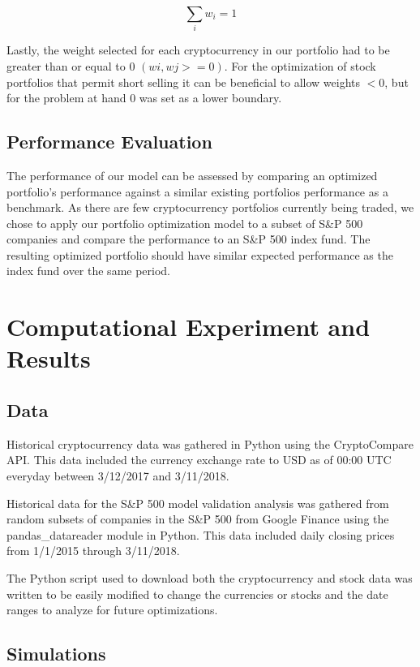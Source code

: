 \documentclass[11pt]{article} %
\begin{document}
\begin{equation} 
\sum_i w_i = 1
\end{equation}
 
Lastly, the weight selected for each cryptocurrency in our portfolio had to be greater than or equal to 0 $(wi , wj >= 0)$.  For the optimization of stock portfolios that permit short selling it can be beneficial to allow weights $<0$, but for the problem at hand 0 was set as a lower boundary. 

\subsection{Performance Evaluation}

The performance of our model can be assessed by comparing an optimized portfolio’s performance against a similar existing portfolios performance as a benchmark. As there are few cryptocurrency portfolios currently being traded, we chose to apply our portfolio optimization model to a subset of S\&P 500 companies and compare the performance to an S\&P 500 index fund. The resulting optimized portfolio should have similar expected performance as the index fund over the same period.  

\section{Computational Experiment and Results}

\subsection{Data}

Historical cryptocurrency data was gathered in Python using the CryptoCompare API. This data included the currency exchange rate to USD as of 00:00 UTC everyday between 3/12/2017 and 3/11/2018. 

Historical data for the S\&P 500 model validation analysis was gathered from random subsets of companies in the S\&P 500 from Google Finance using the pandas\_datareader module in Python. This data included daily closing prices from 1/1/2015 through 3/11/2018.

The Python script used to download both the cryptocurrency and stock data was written to be easily modified to change the currencies or stocks and the date ranges to analyze for future optimizations.

\subsection{Simulations}
\end{document}
